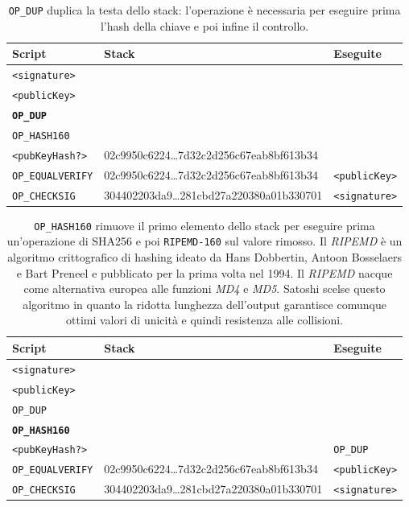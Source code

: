 \begin{table}[H]
    \centering
    \begin{tabular}{p{3cm}|p{7.7cm}|p{3cm}}
        Script & Stack & Eseguite\\
        \hline
        \texttt{<signature>}          & &\\
        \texttt{<publicKey>}          & &\\
        \texttt{\textbf{OP\_DUP}}     & &\\
        \texttt{OP\_HASH160}          & &\\
        \texttt{<pubKeyHash?>}        & 02c9950c6224\dots7d32c2d256c67eab8bf613b34 &\\
        \texttt{OP\_EQUALVERIFY}      & 02c9950c6224\dots7d32c2d256c67eab8bf613b34 & \texttt{<publicKey>}\\
        \texttt{OP\_CHECKSIG}         & 304402203da9\dots281cbd27a220380a01b330701 & \texttt{<signature>}\\
    \end{tabular}
    \caption{\texttt{OP\_DUP} duplica la testa dello stack: l'operazione è necessaria per eseguire prima l'hash della chiave e poi infine il controllo.}
\end{table}

\begin{table}[H]
    \centering
    \begin{tabular}{p{3cm}|p{7.7cm}|p{3cm}}
        Script & Stack & Eseguite\\
        \hline
        \texttt{<signature>}          & &\\
        \texttt{<publicKey>}          & &\\
        \texttt{OP\_DUP}              & &\\
        \texttt{\textbf{OP\_HASH160}} & &\\
        \texttt{<pubKeyHash?>}        &                                            & \texttt{OP\_DUP}\\
        \texttt{OP\_EQUALVERIFY}      & 02c9950c6224\dots7d32c2d256c67eab8bf613b34 & \texttt{<publicKey>}\\
        \texttt{OP\_CHECKSIG}         & 304402203da9\dots281cbd27a220380a01b330701 & \texttt{<signature>}\\
    \end{tabular}
    \caption{\texttt{OP\_HASH160} rimuove il primo elemento dello stack per eseguire prima un'operazione di SHA256 e poi \texttt{RIPEMD-160} sul valore rimosso. Il \textit{RIPEMD} è un algoritmo crittografico di hashing ideato da Hans Dobbertin, Antoon Bosselaers e Bart Preneel  e pubblicato per la prima volta nel 1994. Il \textit{RIPEMD} nacque come alternativa europea alle funzioni \textit{MD4} e \textit{MD5}. Satoshi scelse questo algoritmo in quanto la ridotta lunghezza dell'output garantisce comunque ottimi valori di unicità e quindi resistenza alle collisioni.}
\end{table}

